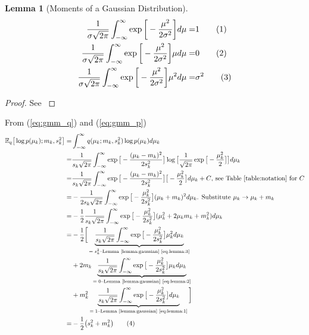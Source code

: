 \documentclass[]{article}
\newcommand{\Expectation} {\mathbb{E}}
\newcommand\numberthis    {\addtocounter{equation}{1}\tag{\theequation}}
\newtheorem{lemma}[thm]{Lemma}
\begin{document}
\begin{lemma}[Moments of a Gaussian Distribution]\label{lemma:gaussian}
	\begin{align*}
		\frac{1}{\sigma\sqrt{2\pi}} \int_{-\infty}^{\infty} \exp{\bigg[-\frac{\mu^2}{2 \sigma^2}\bigg]} d \mu =& 1 \numberthis \label{eq:lemma:1}\\
		\frac{1}{\sigma\sqrt{2\pi}} \int_{-\infty}^{\infty} \exp{\bigg[-\frac{\mu^2}{2 \sigma^2}\bigg]} \mu d \mu =& 0 \numberthis \label{eq:lemma:2}\\
		\frac{1}{\sigma\sqrt{2\pi}} \int_{-\infty}^{\infty} \exp{\bigg[-\frac{\mu^2}{2 \sigma^2}\bigg]} \mu^2 d \mu =& \sigma^2 \numberthis \label{eq:lemma:3}
	\end{align*}
\end{lemma}
\begin{proof}
	See \cite[Equation (5.7.5)]{fisz1963probability}
\end{proof}
From (\ref{eq:gmm_q}) and (\ref{eq:gmm_p})
\begin{align*}
	 \Expectation_q \big[ \log {p(\mu_k);m_k,s_k^2}\big]  =& \int_{-\infty}^{\infty} q(\mu_k;m_k,s_k^2) \log {p(\mu_k)}  d\mu_k\\
	 =& \frac{1}{s_k\sqrt{2\pi}} \int_{-\infty}^{\infty} \exp{\big[-\frac{(\mu_k-m_k)^2}{2 s_k^2}\big]}\log{\big[\frac{1}{\sqrt{2\pi}} \exp{\big[- \frac{\mu_k^2}{2}\big]}\big]} d\mu_k\\
	 =&\frac{1}{s_k\sqrt{2\pi}} \int_{-\infty}^{\infty} \exp{\big[-\frac{(\mu_k-m_k)^2}{2 s_k^2}\big]}\big[ - \frac{\mu_k^2}{2}\big] d\mu_k+ C \text{, see Table \ref{table:notation} for $C$}\\
	 =& - \frac{1}{2 s_k\sqrt{2\pi}} \int_{-\infty}^{\infty} \exp{\big[-\frac{\mu_k^2}{2 s_k^2}\big]}(\mu_k+m_k)^2 d\mu_k \text{. Substitute $\mu_k \rightarrow \mu_k+m_k$}\\
	 =&- \frac{1}{2}\frac{1}{s_k\sqrt{2\pi} } \int_{-\infty}^{\infty} \exp{\big[-\frac{\mu_k^2}{2 s_k^2}\big]}(\mu_k^2 +2 \mu_k m_k + m_k^2) d\mu_k\\
	 =&- \frac{1}{2}\bigg[\underbrace{\frac{1}{s_k\sqrt{2\pi} } \int_{-\infty}^{\infty} \exp{\big[-\frac{\mu_k^2}{2 s_k^2}\big]}\mu_k^2  d\mu_k}_\text{$=s_k^2$--Lemma \ref{lemma:gaussian} \eqref{eq:lemma:3}}\\
	 \;&+2  m_k \underbrace{\frac{1}{s_k\sqrt{2\pi} } \int_{-\infty}^{\infty} \exp{\big[-\frac{\mu_k^2}{2 s_k^2}\big]} \mu_k  d\mu_k}_\text{$=0$--Lemma \ref{lemma:gaussian} \eqref{eq:lemma:2}}\\
	 \;&+m_k^2 \underbrace{\frac{1}{s_k\sqrt{2\pi} } \int_{-\infty}^{\infty} \exp{\big[-\frac{\mu_k^2}{2 s_k^2}\big]} d\mu_k}_\text{$=1$--Lemma \ref{lemma:gaussian} \eqref{eq:lemma:1}}\bigg]\\
	  =&- \frac{1}{2 } \big(s_k^2 +  m_k^2\big) \numberthis \label{eq:ELBO:1}
\end{align*}
\end{document}
